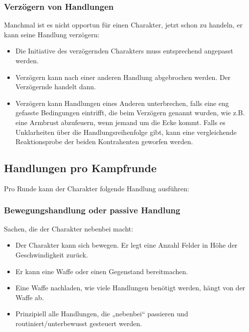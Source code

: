 \documentclass{article}
\begin{document}
\subsubsection{Verzögern von Handlungen}

Manchmal ist es nicht opportun für einen Charakter, jetzt schon zu handeln, er kann seine Handlung verzögern:

\begin{itemize}
\item Die Initiative des verzögernden Charakters muss entsprechend angepasst werden.
\item Verzögern kann nach einer anderen Handlung abgebrochen werden. Der Verzögernde handelt dann.
\item Verzögern kann Handlungen eines Anderen unterbrechen, falls eine eng gefasste Bedingungen eintrifft, die beim Verzögern genannt wurden, wie z.B. eine Armbrust abzufeuern, wenn jemand um die Ecke kommt. Falls es Unklarheiten über die Handlungsreihenfolge gibt, kann eine vergleichende Reaktionsprobe der beiden Kontrahenten geworfen werden.
\end{itemize}

\begin{center}
\subsection{Handlungen pro Kampfrunde}
\end{center}

Pro Runde kann der Charakter folgende Handlung ausführen:

\subsubsection{Bewegungshandlung oder passive Handlung}

Sachen, die der Charakter nebenbei macht:

\begin{itemize}
\item Der Charakter kann sich bewegen. Er legt eine Anzahl Felder in Höhe der Geschwindigkeit zurück.
\item Er kann eine Waffe oder einen Gegenstand bereitmachen.
\item Eine Waffe nachladen, wie viele Handlungen benötigt werden, hängt von der Waffe ab.
\item Prinzipiell alle Handlungen, die „nebenbei“ passieren und routiniert/unterbewusst gesteuert werden.
\end{itemize}
\end{document}
